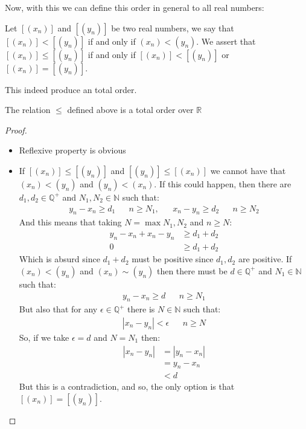 \documentclass{tufte-handout}
\begin{document}
Now, with this we can define this order in general to all real numbers:
\begin{definition}
	Let $[(x_n)]$ and $[(y_n)]$ be two real numbers, we say that $[(x_n)] < [(y_n)]$ if and only if $(x_n) < (y_n)$. We assert that $[(x_n)] \le [(y_n)]$ if and only if $[(x_n)] < [(y_n)]$ or $[(x_n)] = [(y_n)]$.
\end{definition}

This indeed produce an total order.

\begin{theorem}
	The relation $\le$ defined above is a total order over $\mathbb{R}$
\end{theorem}
\begin{proof}
	\begin{itemize}
		\item Reflexive property is obvious
		\item If $[(x_n)] \le [(y_n)]$ and $[(y_n)] \le [(x_n)]$ we cannot have that $(x_n) < (y_n)$ and $(y_n) < (x_n)$. If this could happen, then there are $d_1, d_2 \in \mathbb{Q}^+$ and $N_1, N_2 \in \mathbb{N}$ such that:
		\begin{align*}
			y_n - x_n \ge d_1 && n \ge N_1, && x_n - y_n \ge d_2 && n \ge N_2
		\end{align*}
		And this means that taking $N = \max{N_1, N_2}$ and $n \ge N$:
		\begin{align*}
			y_n - x_n + x_n - y_n &\ge d_1 + d_2\\
			0 &\ge d_1 + d_2
		\end{align*}
		Which is absurd since $d_1 + d_2$ must be positive since $d_1, d_2$ are positive. If $(x_n) < (y_n)$ and $(x_n) \sim (y_n)$ then there must be $d \in \mathbb{Q}^+$ and $N_1 \in \mathbb{N}$ such that:
		\begin{align*}
			y_n - x_n \ge d && n \ge N_1
		\end{align*}
		But also that for any $\epsilon \in \mathbb{Q}^+$ there is $N \in \mathbb{N}$ such that:
		\begin{align*}
			|x_n - y_n| < \epsilon && n \ge N
		\end{align*}
		So, if we take $\epsilon = d$ and $N = N_1$ then:
		\begin{align*}
			|x_n - y_n| &= |y_n - x_n|\\
			&= y_n - x_n\\
			&< d
		\end{align*}
		But this is a contradiction, and so, the only option is that $[(x_n)] = [(y_n)]$.


\end{itemize}
\end{proof}
\end{document}
